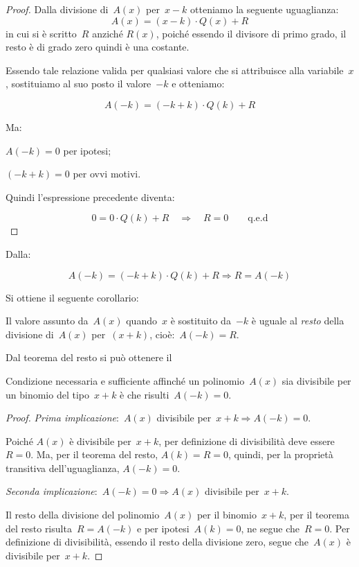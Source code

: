 \begin{proof}
 Dalla divisione di~\(A(x)\) per~\(x-k\) otteniamo la seguente
uguaglianza:
\[A(x)=(x-k)\cdot Q(x)+R\]
in cui si è scritto~\(R\) anziché \(R(x)\), poiché essendo il divisore di primo 
grado, il resto è di grado zero quindi è una costante.

Essendo tale relazione valida per qualsiasi valore che si attribuisce
alla variabile~\(x\), sostituiamo al suo posto il valore~\(-k\) e otteniamo:

\[A(-k)=(-k+k) \cdot Q(k)+R\]

Ma:

\begin{itemize*}
 \item \(A(-k)=0\) per ipotesi;
 \item \((-k+k)=0\) per ovvi motivi.
\end{itemize*}

Quindi l'espressione precedente diventa:

\[0=0 \cdot Q(k)+R \quad \Longrightarrow \quad R=0 \qquad \text{q.e.d}\]

\end{proof}

Dalla:

\[A(-k)=(-k+k) \cdot Q(k)+R \Longrightarrow R=A(-k)\]

Si ottiene il seguente corollario:

Il valore assunto da~\(A(x)\) quando~\(x\) è sostituito da~\(-k\)
è uguale al \emph{resto} della divisione di~\(A(x)\) per~\((x+k)\), 
cioè:~\(A(-k)=R\).

Dal teorema del resto si può ottenere il

\begin{teorema}[di Ruffini]
Condizione necessaria e sufficiente affinché un polinomio~\(A(x)\) 
sia divisibile per un binomio del tipo~\(x+k\) è
che risulti~\(A(-k)=0\).
\end{teorema}

\begin{proof}

\emph{Prima implicazione}:~\(A(x)\) divisibile per~\(x+k\Rightarrow A(-k)=0\).

Poiché \(A(x)\) è divisibile per~\(x+k\), per definizione di divisibilità deve 
essere~\(R=0\). 
Ma, per il teorema del resto, \(A(k)=R=0\), 
quindi, per la proprietà transitiva dell'uguaglianza, \(A(-k)=0\).

\emph{Seconda implicazione}:~\(A(-k)=0\Rightarrow A(x)\) divisibile per~\(x+k\).

Il resto della divisione del polinomio~\(A(x)\) per il binomio~\(x+k\),
per il teorema del resto risulta~\(R=A(-k)\) e per ipotesi~\(A(k)=0\),
ne segue che~\(R=0\). Per definizione di divisibilità, essendo il
resto della divisione zero, segue che~\(A(x)\) è divisibile per~\(x+k\).
\end{proof}

